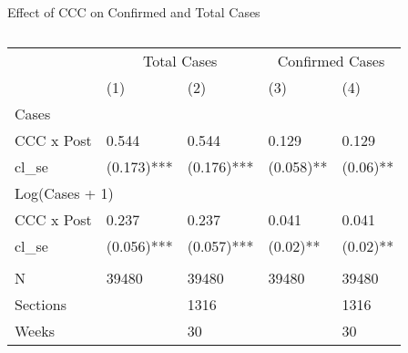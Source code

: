 
\begin{table}[ht!]
\centering
\caption{Effect of CCC on Confirmed and Total Cases}
\label{tab:table-1}
\begin{tabular}{lllll}
\toprule
& \multicolumn{2}{c}{Total Cases} & \multicolumn{2}{c}{Confirmed Cases} \\ 
 \cmidrule(lr){2-3}\cmidrule(lr){4-5}
 & (1) & (2) & (3) & (4) \\ 
\midrule
\multicolumn{3}{l}{Cases} \\ 
\midrule
CCC x Post & 0.544 & 0.544 & 0.129 & 0.129 \\ 
cl\_se & (0.173)*** & (0.176)*** & (0.058)** & (0.06)** \\ 
\midrule
\multicolumn{3}{l}{Log(Cases + 1)} \\ 
\midrule
CCC x Post & 0.237 & 0.237 & 0.041 & 0.041 \\ 
cl\_se & (0.056)*** & (0.057)*** & (0.02)** & (0.02)** \\ 
\midrule
\multicolumn{3}{l}{} \\ 
\midrule
N & 39480 & 39480 & 39480 & 39480 \\ 
Sections &  & 1316 &  & 1316 \\ 
Weeks &  & 30 &  & 30 \\ 
\bottomrule
\end{tabular}
\caption*{\footnotesize}
\end{table}


